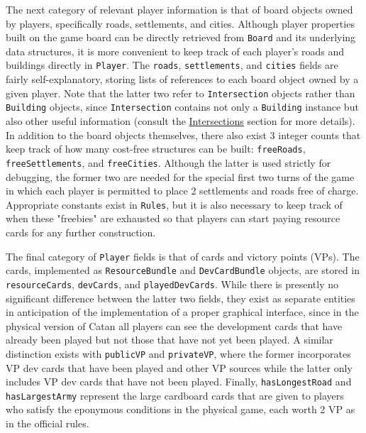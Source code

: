 \documentclass[pageno]{jpaper}
\begin{document}
\begin{doublespacing}
The next category of relevant player information is that of board objects owned by players, specifically roads, settlements, and cities. Although player properties built on the game board can be directly retrieved from \lstinline$Board$ and its underlying data structures, it is more convenient to keep track of each player's roads and buildings directly in \lstinline$Player$. The \lstinline$roads$, \lstinline$settlements$, and \lstinline$cities$ fields are fairly self-explanatory, storing lists of references to each board object owned by a given player. Note that the latter two refer to \lstinline$Intersection$ objects rather than \lstinline$Building$ objects, since \lstinline$Intersection$ contains not only a \lstinline$Building$ instance but also other useful information (consult the \hyperlink{sec:intersections}{Intersections} section for more details). In addition to the board objects themselves, there also exist 3 integer counts that keep track of how many cost-free structures can be built: \lstinline$freeRoads$, \lstinline$freeSettlements$, and \lstinline$freeCities$. Although the latter is used strictly for debugging, the former two are needed for the special first two turns of the game in which each player is permitted to place 2 settlements and roads free of charge. Appropriate constants exist in \lstinline$Rules$, but it is also necessary to keep track of when these "freebies" are exhausted so that players can start paying resource cards for any further construction.
    
The final category of \lstinline$Player$ fields is that of cards and victory points (VPs). The cards, implemented as \lstinline$ResourceBundle$ and \lstinline$DevCardBundle$ objects, are stored in \lstinline$resourceCards$, \lstinline$devCards$, and \lstinline$playedDevCards$. While there is presently no significant difference between the latter two fields, they exist as separate entities in anticipation of the implementation of a proper graphical interface, since in the physical version of Catan all players can see the development cards that have already been played but not those that have not yet been played. A similar distinction exists with \lstinline$publicVP$ and \lstinline$privateVP$, where the former incorporates VP dev cards that have been played and other VP sources while the latter only includes VP dev cards that have not been played. Finally, \lstinline$hasLongestRoad$ and \lstinline$hasLargestArmy$ represent the large cardboard cards that are given to players who satisfy the eponymous conditions in the physical game, each worth 2 VP as in the official rules.


\end{doublespacing}
\end{document}
